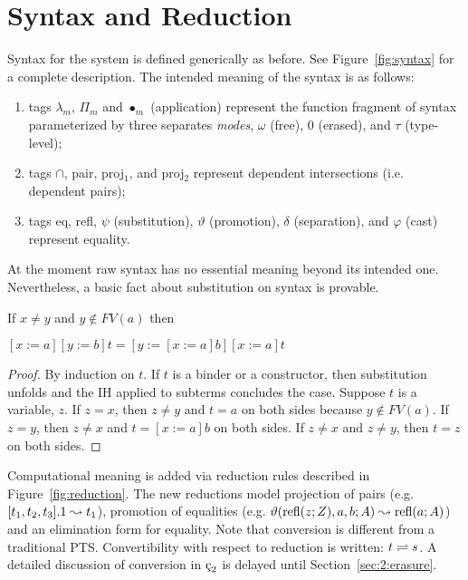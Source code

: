 \section{Syntax and Reduction}




Syntax for the system is defined generically as before.
See Figure~\ref{fig:syntax} for a complete description.
The intended meaning of the syntax is as follows:
\begin{enumerate}
    \item tags $\lambda_m$, $\Pi_m$ and $\bullet_m$ (application) represent the function fragment of syntax parameterized by three separates \textit{modes}, $\omega$ (free), $0$ (erased), and $\tau$ (type-level);
    \item tags $\cap$, pair, proj$_1$, and proj$_2$ represent dependent intersections (i.e. dependent pairs);
    \item tags eq, refl, $\psi$ (substitution), $\vartheta$ (promotion), $\delta$ (separation), and $\varphi$ (cast) represent equality.
\end{enumerate}
At the moment raw syntax has no essential meaning beyond its intended one.
Nevertheless, a basic fact about substitution on syntax is provable.

\begin{lemma}
    If $x \neq y$ and $y \notin FV(a)$ then \begin{tightcenter} $[x := a][y := b]t = [y := [x := a]b][x := a]t$ \end{tightcenter}
    \label{lem:2:subst_commute}
\end{lemma}
\begin{proof}
    By induction on $t$.
    If $t$ is a binder or a constructor, then substitution unfolds and the IH applied to subterms concludes the case.
    Suppose $t$ is a variable, $z$.
    If $z = x$, then $z \neq y$ and $t = a$ on both sides because $y \notin FV(a)$.
    If $z = y$, then $z \neq x$ and $t = [x := a]b$ on both sides.
    If $z \neq x$ and $z \neq y$, then $t = z$ on both sides.
\end{proof}

Computational meaning is added via reduction rules described in Figure~\ref{fig:reduction}.
The new reductions model projection of pairs (e.g. $[t_1, t_2, t_3].1 \leadsto t_1$), promotion of equalities (e.g. $\vartheta(\text{refl}(z; Z), a, b; A) \leadsto \text{refl}(a; A)$) and an elimination form for equality.
Note that conversion is different from a traditional PTS.
Convertibility with respect to reduction is written: $t \rightleftharpoons s$.
A detailed discussion of conversion in $\ced$ is delayed until Section~\ref{sec:2:erasure}.

